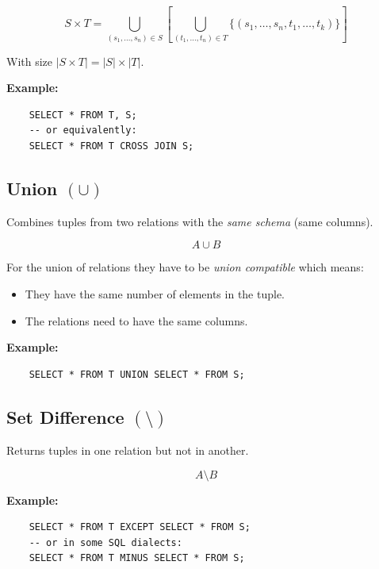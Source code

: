 \[
    S \times T = \bigcup_{(s_1, \dots, s_n) \in S} \left[ \bigcup_{(t_1, \dots, t_n) \in T} \{(s_1, \dots, s_n, t_1, \dots, t_k)\} 
    \right]
\]

With size \(|S \times T|  = |S| \times |T|\).

\textbf{Example:}

\begin{verbatim}
    SELECT * FROM T, S;
    -- or equivalently:
    SELECT * FROM T CROSS JOIN S;
\end{verbatim}

\subsection{Union \texorpdfstring{\((\cup)\)}{}}

Combines tuples from two relations with the \emph{same schema} (same columns).

\[
    A \cup B
\]

For the union of relations they have to be \emph{union compatible} which means:

\begin{itemize}

    \item They have the same number of elements in the tuple. 

    \item The relations need to have the same columns.

\end{itemize}

\textbf{Example:}

\begin{verbatim}
    SELECT * FROM T UNION SELECT * FROM S;
\end{verbatim}

\subsection{Set Difference \texorpdfstring{\((\setminus)\)}{}}

Returns tuples in one relation but not in another.

\[
    A \setminus B
\]

\textbf{Example:}

\begin{verbatim}
    SELECT * FROM T EXCEPT SELECT * FROM S;
    -- or in some SQL dialects:
    SELECT * FROM T MINUS SELECT * FROM S;
\end{verbatim}

